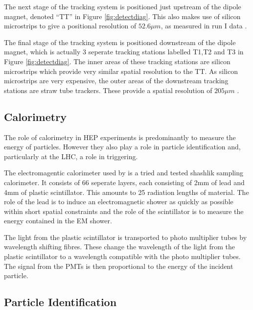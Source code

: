  The next stage of the \lhcb tracking system is positioned just upstream of the dipole magnet, denoted ``TT'' in Figure \ref{fig:detectdiag}.  This also makes use of silicon microstrips to give a positional resolution of $52.6 \mu m$, as measured in run I data \cite{Aaij:1978280}.

The final stage of the tracking system is positioned downstream of the dipole magnet, which is actually 3 seperate tracking stations labelled T1,T2 and T3 in Figure \ref{fig:detectdiag}.  The inner areas of these tracking stations are silicon microstrips which provide very similar spatial resolution to the TT.  As silicon microstrips are very expensive, the outer areas of the downstream tracking stations are straw tube trackers.  These provide a spatial resolution of $205 \mu m$ \cite{Aaij:1978280}.

 
\subsection{Calorimetry}
\label{sec:Calorimetry}
The role of calorimetry in HEP experiments is predominantly to measure the energy of particles.  However they also play a role in particle identification and, particularly at the LHC, a role in triggering.

The electromagentic calorimeter used by \lhcb is a tried and tested shashlik sampling calorimeter.  It consists of 66 seperate layers, each consisting of 2mm of lead and 4mm of plastic scintillator.  This amounts to 25 radiation lengths of material.  The role of the lead is to induce an electromagnetic shower as quickly as possible within short spatial constraints and the role of the scintillator is to measure the energy contained in the EM shower.

The light from the plastic scintillator is transported to photo multiplier tubes by wavelength shifting fibres.  These change the wavelength of the light from the plastic scintillator to a wavelength compatible with the photo multiplier tubes.  The signal from the PMTs is then proportional to the energy of the incident particle.

\subsection{Particle Identification}
\label{sec:Particle Identification}



\clearpage
